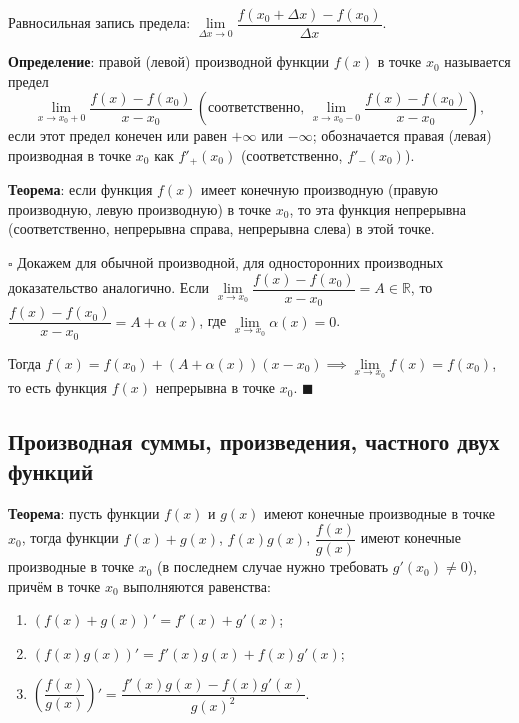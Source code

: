 \documentclass[12pt, a4paper, reqno]{article}
\begin{document}
    Равносильная запись предела: $\lim\limits_{\Delta x\to 0} \dfrac{f(x_0 + \Delta x) -
    f(x_0)}{\Delta x}$.

    \textbf{Определение}: правой (левой) производной функции $f(x)$ в точке $x_0$ называется предел
    \begin{equation*}
        \lim\limits_{x\to x_0 + 0} \dfrac{f(x) - f(x_0)}{x - x_0}\ \left(\text{соответственно, }
        \lim\limits_{x\to x_0 - 0} \dfrac{f(x) - f(x_0)}{x - x_0}\right),
    \end{equation*}
    если этот предел конечен или равен
    $+\infty$ или $-\infty$; обозначается правая (левая) производная в точке $x_0$ как $f'_{+}(x_0)$
    (соответственно, $f'_{-}(x_0)$).

    \textbf{Теорема}: если функция $f(x)$ имеет конечную производную (правую производную, левую
    производную) в точке $x_0$, то эта функция непрерывна (соответственно, непрерывна справа,
    непрерывна слева) в этой точке.

    $\square$ Докажем для обычной производной, для односторонних производных доказательство аналогично.
    Если $\lim\limits_{x\to x_0} \dfrac{f(x) - f(x_0)}{x - x_0} = A\in\mathbb{R}$, то $\dfrac{f(x) -
    f(x_0)}{x - x_0} = A + \alpha(x)$, где $\lim\limits_{x\to x_0} \alpha(x) = 0$.

    Тогда $f(x) = f(x_0) + (A + \alpha(x))(x - x_0) \implies \lim\limits_{x\to x_0} f(x) = f(x_0)$,
    то есть функция $f(x)$ непрерывна в точке $x_0$. $\blacksquare$

\subsection{Производная суммы, произведения, частного двух функций}

    \textbf{Теорема}: пусть функции $f(x)$ и $g(x)$ имеют конечные производные в точке $x_0$, тогда
    функции $f(x) + g(x)$, $f(x)g(x)$, $\dfrac{f(x)}{g(x)}$ имеют конечные производные в точке $x_0$
    (в последнем случае нужно требовать $g'(x_0)\neq 0$), причём в точке $x_0$ выполняются равенства:
    \begin{enumerate}
    \item $(f(x) + g(x))' = f'(x) + g'(x)$;
    \item $(f(x)g(x))' = f'(x)g(x) + f(x)g'(x)$;
    \item $\left(\dfrac{f(x)}{g(x)}\right)' = \dfrac{f'(x)g(x) - f(x)g'(x)}{g(x)^2}$.
    \end{enumerate}
\end{document}
